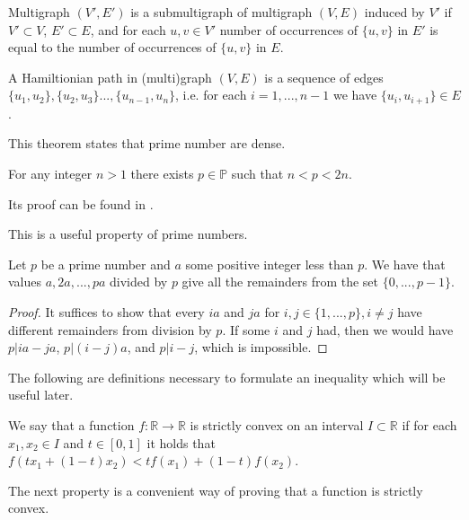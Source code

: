 \begin{defn}
Multigraph $(V', E')$ is a submultigraph of multigraph $(V,E)$ induced by $V'$
if $V' \subset V$, $E' \subset E$, and for each $u,v \in V'$ 
number of occurrences of $\{u,v\}$ in $E'$ is equal to the number of occurrences of $\{u,v\}$ in $E$.
\end{defn}

\begin{defn}
A Hamiltionian path in (multi)graph $(V,E)$
is a sequence of edges $\{u_1, u_2\}, \{u_2, u_3\} ..., \{u_{n-1}, u_n\}$,
i.e. for each $i=1,...,n-1$ we have $\{u_i, u_{i+1}\} \in E$.
\end{defn}


This theorem states that prime number are dense.

\begin{thm} \label{bertrand-chebyshev}
For any integer $n>1$ there exists $p \in \mathbb{P}$ such that $n < p < 2n$.
\end{thm}

Its proof can be found in \cite{bertrand}.

This is a useful property of prime numbers.

\begin{thm} \label{zp}
Let $p$ be a prime number and $a$ some positive integer less than $p$.
We have that values $a, 2a, ..., pa$ divided by $p$ give all the remainders from the set $\{0, ..., p-1\}$.
\end{thm}

\begin{proof}
It suffices to show that every $ia$ and $ja$ for $i,j \in \{1, ..., p\}, i \neq j$
have different remainders from division by $p$.
If some $i$ and $j$ had, then we would have $p | ia - ja$, $p | (i-j)a$, and $p | i-j$, which is impossible.
\end{proof}

The following are definitions necessary to formulate an inequality which will be useful later.

\begin{defn}
We say that a function $f:\mathbb{R}\rightarrow\mathbb{R}$ is strictly convex on an interval $I \subset \mathbb{R}$
if for each $x_1, x_2 \in I$ and $t \in [0,1]$ it holds that $f(t x_1 + (1-t) x_2) < tf(x_1) + (1-t)f(x_2)$.
\end{defn}

The next property is a convenient way of proving that a function is strictly convex.

